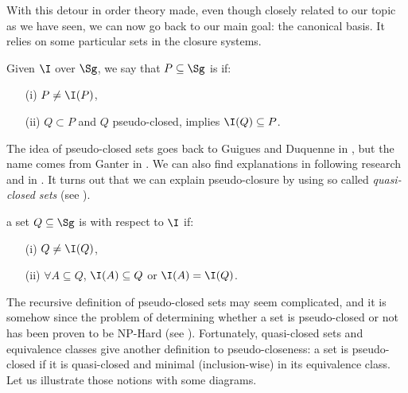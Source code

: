 With this detour in order theory made, even though closely related to our topic
as we have seen, we can now go back to our main goal: the canonical basis. It
relies on some particular sets in the closure systems.

\begin{definition} Given $\I$ over $\Sg$, we say
	that $P \subseteq \Sg$ is  if:
	\begin{itemize}
		\item[(i)] $P \neq \I(P)$,
		\item[(ii)] $Q \subset P$ and $Q$ pseudo-closed, implies $\I(Q) 
		\subseteq P$.
	\end{itemize}
\end{definition}

\noindent The idea of pseudo-closed sets goes back to Guigues and Duquenne in
\cite{guigues_j.l_familles_1986}, but the name comes from Ganter in 
\cite{ganter_two_2010}. We can also find explanations in following 
research \cite{ganter_two_2010, day_lattice_1992} and
in \cite{b._ganter_conceptual_2016}. It turns out that we can explain 
pseudo-closure by using so called \textit{quasi-closed sets} (see 
\cite{wild_implicational_1989, ganter_two_2010, guigues_j.l_familles_1986}). 

\begin{definition} a set $Q \subseteq \Sg$ is 
	 with respect to $\I$ if:
	\begin{itemize}
		\item[(i)] $Q \neq \I(Q)$,
		\item[(ii)] $\forall A \subseteq Q$, $\I(A) \subseteq Q$ or $\I(A) = 
		\I(Q)$.
		
	\end{itemize}
	
\end{definition}

\noindent The recursive definition of pseudo-closed sets may seem complicated,
and it is somehow since the problem of determining whether a set is 
pseudo-closed or not has been proven to be NP-Hard (see 
\cite{b._ganter_conceptual_2016}). Fortunately, quasi-closed sets and 
equivalence classes give another definition to pseudo-closeness: a set is 
pseudo-closed if it is quasi-closed and minimal (inclusion-wise) in its 
equivalence class. Let us illustrate those notions with some diagrams.


